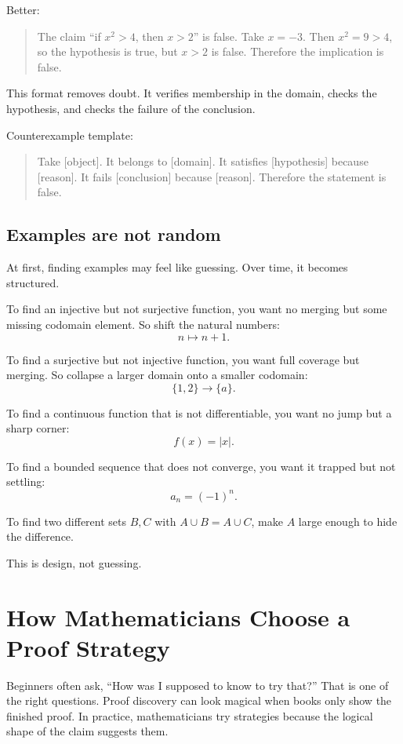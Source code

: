 Better:

\begin{quote}
The claim ``if $x^2>4$, then $x>2$'' is false. Take $x=-3$. Then $x^2=9>4$, so the hypothesis is true, but $x>2$ is false. Therefore the implication is false.
\end{quote}

This format removes doubt. It verifies membership in the domain, checks the hypothesis, and checks the failure of the conclusion.

\begin{formalbox}
Counterexample template:

\begin{quote}
Take [object]. It belongs to [domain]. It satisfies [hypothesis] because [reason]. It fails [conclusion] because [reason]. Therefore the statement is false.
\end{quote}
\end{formalbox}

\subsection{Examples are not random}

At first, finding examples may feel like guessing. Over time, it becomes structured.

To find an injective but not surjective function, you want no merging but some missing codomain element. So shift the natural numbers:
\[
n\mapsto n+1.
\]

To find a surjective but not injective function, you want full coverage but merging. So collapse a larger domain onto a smaller codomain:
\[
\{1,2\}\to\{a\}.
\]

To find a continuous function that is not differentiable, you want no jump but a sharp corner:
\[
f(x)=|x|.
\]

To find a bounded sequence that does not converge, you want it trapped but not settling:
\[
a_n=(-1)^n.
\]

To find two different sets $B,C$ with $A\cup B=A\cup C$, make $A$ large enough to hide the difference.

This is design, not guessing.

\section{How Mathematicians Choose a Proof Strategy}

Beginners often ask, ``How was I supposed to know to try that?'' That is one of
the right questions. Proof discovery can look magical when books only show the
finished proof. In practice, mathematicians try strategies because the logical
shape of the claim suggests them.

